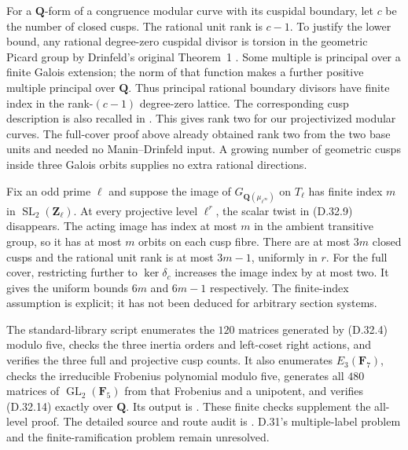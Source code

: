 For a $\mathbf Q$-form of a congruence modular curve with
its cuspidal boundary, let $c$ be the number of closed cusps.
The rational unit rank is $c-1$.
To justify the lower bound, any rational degree-zero
cuspidal divisor is torsion in the geometric Picard group
by Drinfeld's original Theorem~1
\citep[p.~83, Russian original]{D_DrinfeldCusps1973}.
Some multiple is principal over a finite Galois extension;
the norm of that function makes a further positive multiple
principal over $\mathbf Q$.
Thus principal rational boundary divisors have finite index
in the rank-$(c-1)$ degree-zero lattice.
The corresponding cusp description is also recalled in
\citep[\S\S2.3--2.4, Lemma~2.3]{D_ZywinaRunge}.
This gives rank two for our projectivized modular curves.
The full-cover proof above already obtained rank two from
the two base units and needed no Manin--Drinfeld input.
A growing number of geometric cusps inside three Galois
orbits supplies no extra rational directions.

Fix an odd prime $\ell$ and suppose the image of
$G_{\mathbf Q(\mu_{\ell^\infty})}$ on $T_\ell$ has finite
index $m$ in $\operatorname{SL}_2(\mathbf Z_\ell)$.
At every projective level $\ell^r$, the scalar twist in
\textup{(D.32.9)} disappears. The acting image has index at
most $m$ in the ambient transitive group, so it has at most
$m$ orbits on each cusp fibre. There are at most $3m$
closed cusps and the rational unit rank is at most $3m-1$,
uniformly in $r$.
For the full cover, restricting further to $\ker\delta_c$
increases the image index by at most two. It gives the
uniform bounds $6m$ and $6m-1$ respectively.
The finite-index assumption is explicit; it has not been
deduced for arbitrary section systems.

The standard-library script
 enumerates the
$120$ matrices generated by \textup{(D.32.4)} modulo five,
checks the three inertia orders and left-coset right actions,
and verifies the three full and projective cusp counts.
It also enumerates $E_3(\mathbf F_7)$, checks the irreducible
Frobenius polynomial modulo five, generates all $480$
matrices of $\operatorname{GL}_2(\mathbf F_5)$ from that
Frobenius and a unipotent, and verifies
\textup{(D.32.14)} exactly over $\mathbf Q$.
Its output is .
These finite checks supplement the all-level proof.
The detailed source and route audit is
.
D.31's multiple-label problem and the finite-ramification
problem remain unresolved.
